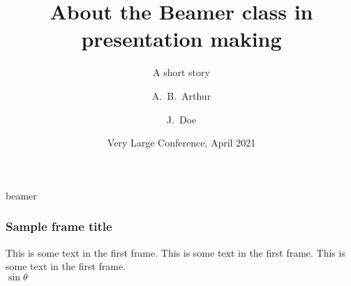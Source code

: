 	{beamer}
\title[About Beamer] %
{About the Beamer class in presentation making}

\subtitle{A short story}

\author[Arthur, Doe] %
{A.~B.~Arthur \and J.~Doe}


\date[VLC 2021] %
{Very Large Conference, April 2021}


\frame{\titlepage}

\begin{frame}
\frametitle{Sample frame title}
This is some text in the first frame. This is some text in the first frame. This is some text in the first frame. \\
$\sin \theta$

\end{frame}

